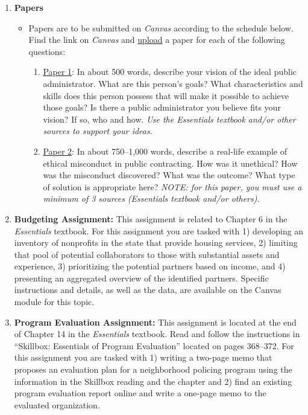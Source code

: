 \documentclass[10pt, letterpaper]{article}
\begin{document}
\begin{enumerate}
	
		\item \textbf{Papers}
			\begin{itemize}
				\item Papers are to be submitted on \emph{Canvas} according to the schedule below. Find the link on \emph{Canvas} and \underline{upload} a paper for each of the following questions:
				\begin{enumerate}
					\item \underline{Paper 1}: In about 500 words, describe your vision of the ideal public administrator. What are this person's goals? What characteristics and skills does this person possess that will make it possible to achieve those goals? Is there a public administrator you believe fits your vision? If so, who and how. \emph{Use the Essentials textbook and/or other sources to support your ideas.}
					\item \underline{Paper 2}: In about 750--1,000 words, describe a real-life example of ethical misconduct in public contracting. How was it unethical? How was the misconduct discovered? What was the outcome? What type of solution is appropriate here? \emph{NOTE: for this paper, you must use a minimum of 3 sources (Essentials textbook and/or others).}
				\end{enumerate}
			\end{itemize}
		\item \textbf{Budgeting Assignment:} This assignment is related to Chapter 6 in the \emph{Essentials} textbook. For this assignment you are tasked with 1) developing an inventory of nonprofits in the state that provide housing services, 2) limiting that pool of potential collaborators to those with substantial assets and experience, 3) prioritizing the potential partners based on income, and 4) presenting an aggregated overview of the identified partners. Specific instructions and details, as well as the data, are available on the Canvas module for this topic. 
		
		\item \textbf{Program Evaluation Assignment:} This assignment is located at the end of Chapter 14 in the \emph{Essentials} textbook. Read and follow the instructions in ``Skillbox: Essentials of Program Evaluation'' located on pages 368--372. For this assignment you are tasked with 1) writing a two-page memo that proposes an evaluation plan for a neighborhood policing program using the information in the Skillbox reading and the chapter and 2) find an existing program evaluation report online and write a one-page memo to the evaluated organization. 
		

\end{enumerate}
\end{document}
